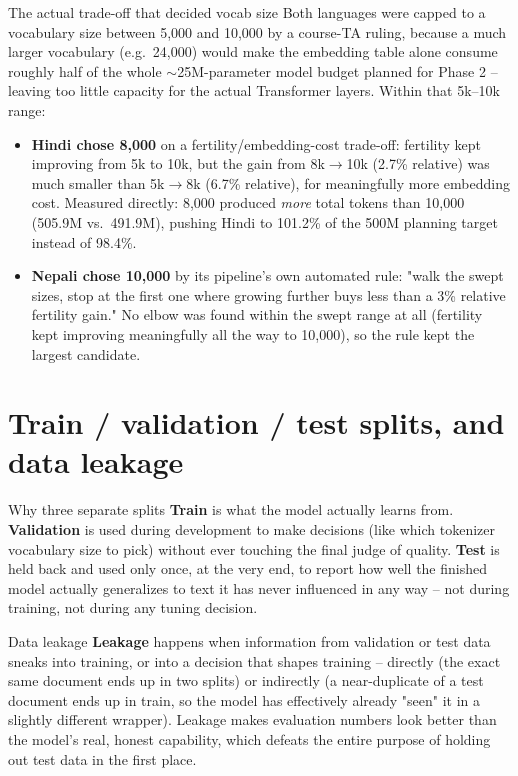 \documentclass[11pt]{report}
\begin{document}
\begin{implementation}{The actual trade-off that decided vocab size}
Both languages were capped to a vocabulary size between 5,000 and 10,000
by a course-TA ruling, because a much larger vocabulary (e.g.\ 24,000)
would make the embedding table alone consume roughly half of the whole
$\sim$25M-parameter model budget planned for Phase 2 -- leaving too
little capacity for the actual Transformer layers. Within that
5k--10k range:

\begin{itemize}
\item \textbf{Hindi chose 8,000} on a fertility/embedding-cost trade-off:
fertility kept improving from 5k to 10k, but the gain from 8k$\to$10k
(2.7\% relative) was much smaller than 5k$\to$8k (6.7\% relative), for
meaningfully more embedding cost. Measured directly: 8,000 produced
\textit{more} total tokens than 10,000 (505.9M vs.\ 491.9M), pushing
Hindi to 101.2\% of the 500M planning target instead of 98.4\%.
\item \textbf{Nepali chose 10,000} by its pipeline's own automated rule:
"walk the swept sizes, stop at the first one where growing further buys
less than a 3\% relative fertility gain." No elbow was found within the
swept range at all (fertility kept improving meaningfully all the way to
10,000), so the rule kept the largest candidate.
\end{itemize}
\end{implementation}

\section{Train / validation / test splits, and data leakage}

\begin{concept}{Why three separate splits}
\textbf{Train} is what the model actually learns from. \textbf{Validation}
is used during development to make decisions (like which tokenizer
vocabulary size to pick) without ever touching the final judge of
quality. \textbf{Test} is held back and used only once, at the very end,
to report how well the finished model actually generalizes to text it
has never influenced in any way -- not during training, not during any
tuning decision.
\end{concept}

\begin{concept}{Data leakage}
\textbf{Leakage} happens when information from validation or test data
sneaks into training, or into a decision that shapes training --
directly (the exact same document ends up in two splits) or indirectly
(a near-duplicate of a test document ends up in train, so the model has
effectively already "seen" it in a slightly different wrapper). Leakage
makes evaluation numbers look better than the model's real, honest
capability, which defeats the entire purpose of holding out test data
in the first place.
\end{concept}
\end{document}
